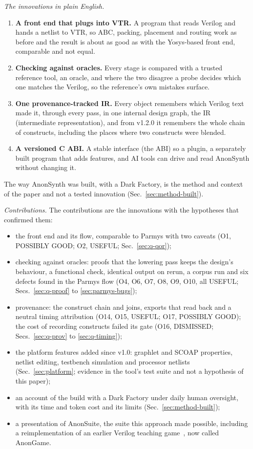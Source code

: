 \documentclass[conference]{IEEEtran}
\begin{document}
\emph{The innovations in plain English.}
\begin{enumerate}
\item \textbf{A front end that plugs into VTR.} A program that reads Verilog and hands a netlist to VTR, so ABC, packing, placement and routing work as before and the result is about as good as with the Yosys-based front end, comparable and not equal.
\item \textbf{Checking against oracles.} Every stage is compared with a trusted reference tool, an oracle, %
and where the two disagree a probe decides which one matches the Verilog, so the reference's own mistakes surface.
\item \textbf{One provenance-tracked IR.} Every object remembers which Verilog text made it, through every pass, in one internal design graph, the IR (intermediate representation), %
and from v1.2.0 it remembers the whole chain of constructs, including the places where two constructs were blended.
\item \textbf{A versioned C ABI.} A stable interface (the ABI) so a plugin, a separately built program that adds features, and AI tools can drive and read AnonSynth without changing it. %
\end{enumerate}
The way AnonSynth was built, with a Dark Factory, is the method and context of the paper and not a tested innovation (Sec.~\ref{sec:method-built}).

\emph{Contributions.} The contributions are the innovations with the hypotheses that confirmed them:
\begin{itemize}
\item the front end and its flow, comparable to Parmys with two caveats (O1, POSSIBLY GOOD; O2, USEFUL; Sec.~\ref{sec:q-qor});
\item checking against oracles: proofs that the lowering pass keeps the design's behaviour, a functional check, identical output on rerun, a corpus run and six defects found in the Parmys flow (O4, O6, O7, O8, O9, O10, all USEFUL; Secs.~\ref{sec:q-proof} to \ref{sec:parmys-bugs});
\item provenance: the construct chain and joins, exports that read back and a neutral timing attribution (O14, O15, USEFUL; O17, POSSIBLY GOOD); the cost of recording constructs failed its gate (O16, DISMISSED; Secs.~\ref{sec:q-prov} to \ref{sec:q-timing});
\item the platform features added since v1.0: graphlet and SCOAP properties, netlist editing, testbench simulation and processor netlists (Sec.~\ref{sec:platform}; evidence in the tool's test suite and not a hypothesis of this paper);
\item an account of the build with a Dark Factory under daily human oversight, with its time and token cost and its limits (Sec.~\ref{sec:method-built});
\item a presentation of AnonSuite, the suite this approach made possible, including a reimplementation of an earlier Verilog teaching game~\cite{anon01}, now called AnonGame.
\end{itemize}
\end{document}

